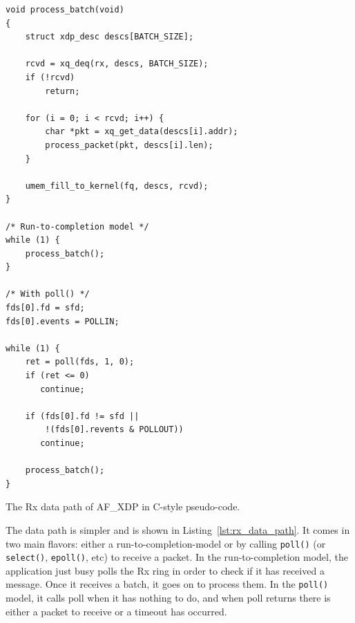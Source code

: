 \documentclass[9pt,numbers,reprint]{sigplanconf}
\begin{document}
\begin{listing}[ht]
\begin{verbatim}
void process_batch(void)
{
    struct xdp_desc descs[BATCH_SIZE];

    rcvd = xq_deq(rx, descs, BATCH_SIZE);
    if (!rcvd)
        return;

    for (i = 0; i < rcvd; i++) {
        char *pkt = xq_get_data(descs[i].addr);
        process_packet(pkt, descs[i].len);
    }

    umem_fill_to_kernel(fq, descs, rcvd);
}

/* Run-to-completion model */
while (1) {
    process_batch();
}

/* With poll() */
fds[0].fd = sfd;
fds[0].events = POLLIN;

while (1) {
    ret = poll(fds, 1, 0);
    if (ret <= 0)
       continue;

    if (fds[0].fd != sfd ||
        !(fds[0].revents & POLLOUT))
       continue;

    process_batch();
}
\end{verbatim}
\caption{The Rx data path of AF\_XDP in C-style pseudo-code.}
\label{lst:rx_data_path}
\end{listing}

The data path is simpler and is shown in
Listing~\ref{lst:rx_data_path}. It comes in two main flavors: either a
run-to-completion-model or by calling {\tt poll()} (or {\tt select()},
{\tt epoll()}, etc) to receive a packet. In the run-to-completion
model, the application just busy polls the Rx ring in order to check
if it has received a message. Once it receives a batch, it goes on to
process them. In the {\tt poll()} model, it calls poll when it has
nothing to do, and when poll returns there is either a packet to
receive or a timeout has occurred.
\end{document}
